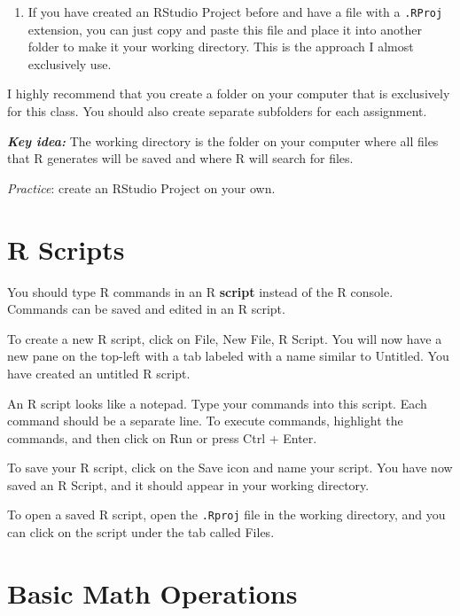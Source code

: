 \documentclass[
]{book}
\providecommand{\tightlist}{%
  \setlength{\itemsep}{0pt}\setlength{\parskip}{0pt}}
\theoremstyle{definition}
\theoremstyle{definition}
\theoremstyle{definition}
\theoremstyle{definition}
\theoremstyle{remark}
\begin{document}
\begin{enumerate}
\def\labelenumi{\arabic{enumi}.}
\setcounter{enumi}{1}
\tightlist
\item
  If you have created an RStudio Project before and have a file with a \texttt{.RProj} extension, you can just copy and paste this file and place it into another folder to make it your working directory. This is the approach I almost exclusively use.
\end{enumerate}

I highly recommend that you create a folder on your computer that is exclusively for this class. You should also create separate subfolders for each assignment.

\textbf{\emph{Key idea:}} The working directory is the folder on your computer where all files that R generates will be saved and where R will search for files.

\emph{Practice}: create an RStudio Project on your own.

\hypertarget{r-scripts}{%
\section{R Scripts}\label{r-scripts}}

You should type R commands in an R \textbf{script} instead of the R console. Commands can be saved and edited in an R script.

To create a new R script, click on File, New File, R Script. You will now have a new pane on the top-left with a tab labeled with a name similar to Untitled. You have created an untitled R script.

An R script looks like a notepad. Type your commands into this script. Each command should be a separate line. To execute commands, highlight the commands, and then click on Run or press Ctrl + Enter.

To save your R script, click on the Save icon and name your script. You have now saved an R Script, and it should appear in your working directory.

To open a saved R script, open the \texttt{.Rproj} file in the working directory, and you can click on the script under the tab called Files.

\hypertarget{basic-math-operations}{%
\section{Basic Math Operations}\label{basic-math-operations}}
\end{document}
